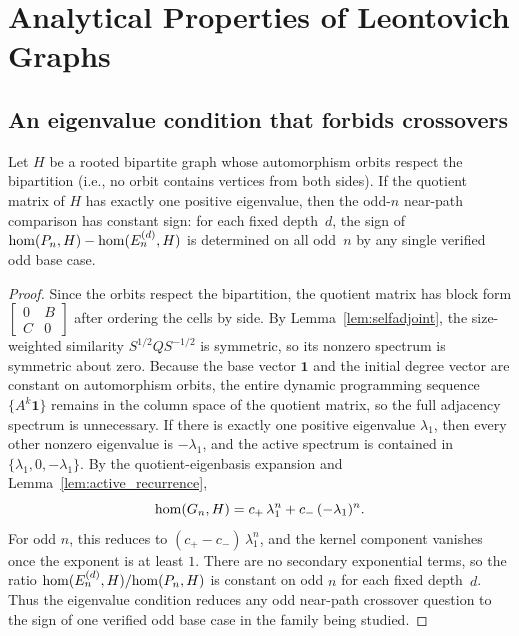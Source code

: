 \section{Analytical Properties of Leontovich Graphs}
\label{sec:leontovich}

\subsection{An eigenvalue condition that forbids crossovers}

\begin{theorem}
  \label{thm:spectral}
  Let $H$ be a rooted bipartite graph whose automorphism orbits respect
  the bipartition (i.e., no orbit contains vertices from both sides).
  If the quotient matrix of $H$ has exactly one positive eigenvalue,
  then the odd-$n$ near-path comparison has constant sign: for each fixed
  depth~$d$, the sign of $\mathrm{hom}(P_n,H)-\mathrm{hom}(E_n^{(d)},H)$ is determined on
  all odd~$n$ by any single verified odd base case.
\end{theorem}

\begin{proof}
  Since the orbits respect the bipartition, the quotient matrix has
  block form $\left[\begin{smallmatrix}0&B\\C&0\end{smallmatrix}\right]$
  after ordering the cells by side. By Lemma~\ref{lem:selfadjoint}, the
  size-weighted similarity $S^{1/2}QS^{-1/2}$ is symmetric, so its
  nonzero spectrum is symmetric about zero.
  Because the base vector $\mathbf{1}$ and the initial degree vector
  are constant on automorphism orbits, the entire dynamic programming
  sequence $\{A^k \mathbf{1}\}$ remains in the column space of the
  quotient matrix, so the full adjacency spectrum is unnecessary.
  If there is exactly one positive eigenvalue $\lambda_1$, then every
  other nonzero eigenvalue is $-\lambda_1$, and the active spectrum is
  contained in $\{\lambda_1, 0, -\lambda_1\}$. By the quotient-eigenbasis
  expansion and Lemma~\ref{lem:active_recurrence},
  \[
    \mathrm{hom}(G_n, H) = c_+\,\lambda_1^n + c_-\,(-\lambda_1)^n.
  \]
  For odd $n$, this reduces to $(c_+ - c_-)\,\lambda_1^n$, and the kernel
  component vanishes once the exponent is at least $1$. There are no
  secondary exponential terms, so the ratio
  $\mathrm{hom}(E_n^{(d)}, H) / \mathrm{hom}(P_n, H)$ is constant on odd $n$ for each
  fixed depth~$d$. Thus the
  eigenvalue condition reduces any odd near-path crossover question to
  the sign of one verified odd base case in the family being studied.
\end{proof}

